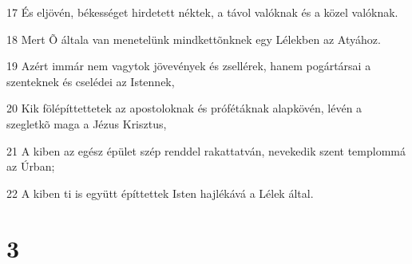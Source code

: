 \par 17 És eljövén, békességet hirdetett néktek, a távol valóknak és a közel valóknak.
\par 18 Mert Õ általa van menetelünk mindkettõnknek egy Lélekben az Atyához.
\par 19 Azért immár nem vagytok jövevények és zsellérek, hanem pogártársai a szenteknek és cselédei az Istennek,
\par 20 Kik fölépíttettetek az apostoloknak és prófétáknak alapkövén, lévén a szegletkõ maga a Jézus Krisztus,
\par 21 A kiben az egész épület szép renddel rakattatván, nevekedik szent templommá az Úrban;
\par 22 A kiben ti is együtt építtettek Isten hajlékává a Lélek által.

\chapter{3}

